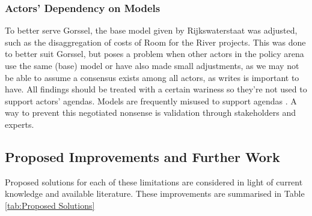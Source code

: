 \subsubsection{Actors' Dependency on Models}
To better serve Gorssel, the base model given by Rijkswaterstaat was adjusted, such as the disaggregation of costs of Room for the River projects. This was done to better suit Gorssel, but poses a problem when other actors in the policy arena use the same (base) model or have also made small adjustments, as we may not be able to assume a consensus exists among all actors, as \cite{kwakkel_coping_2016} writes is important to have. All findings should be treated with a certain wariness so they're not used to support actors' agendas. Models are frequently misused to support agendas \parencite{saltelli_five_2020}. A way to prevent this negotiated nonsense is validation through stakeholders and experts. 

\subsection{Proposed Improvements and Further Work}
Proposed solutions for each of these limitations are considered in light of current knowledge and available literature. These improvements are summarised in Table \ref{tab:Proposed Solutions}

